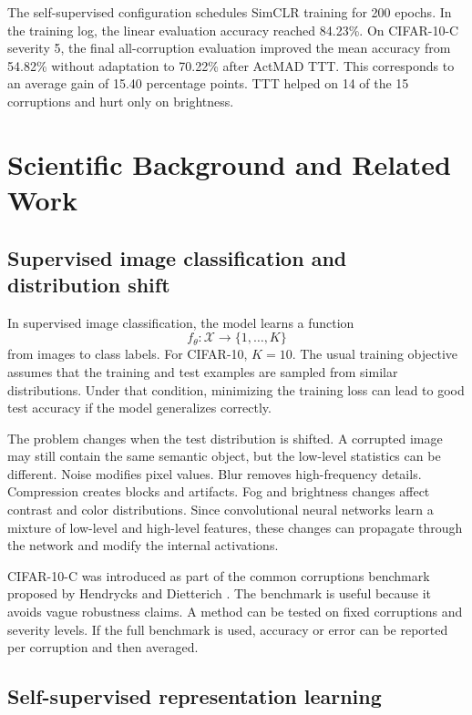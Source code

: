 \documentclass[a4paper,11pt]{article}
\begin{document}
The self-supervised configuration schedules SimCLR training for 200 epochs. In the training log, the linear evaluation accuracy reached 84.23\%. On CIFAR-10-C severity 5, the final all-corruption evaluation improved the mean accuracy from 54.82\% without adaptation to 70.22\% after ActMAD TTT. This corresponds to an average gain of 15.40 percentage points. TTT helped on 14 of the 15 corruptions and hurt only on brightness.

\section{Scientific Background and Related Work}

\subsection{Supervised image classification and distribution shift}

In supervised image classification, the model learns a function
\[
f_\theta : \mathcal{X} \rightarrow \{1,\ldots,K\}
\]
from images to class labels. For CIFAR-10, \(K=10\). The usual training objective assumes that the training and test examples are sampled from similar distributions. Under that condition, minimizing the training loss can lead to good test accuracy if the model generalizes correctly.

The problem changes when the test distribution is shifted. A corrupted image may still contain the same semantic object, but the low-level statistics can be different. Noise modifies pixel values. Blur removes high-frequency details. Compression creates blocks and artifacts. Fog and brightness changes affect contrast and color distributions. Since convolutional neural networks learn a mixture of low-level and high-level features, these changes can propagate through the network and modify the internal activations.

CIFAR-10-C was introduced as part of the common corruptions benchmark proposed by Hendrycks and Dietterich \citep{hendrycks2019robustness}. The benchmark is useful because it avoids vague robustness claims. A method can be tested on fixed corruptions and severity levels. If the full benchmark is used, accuracy or error can be reported per corruption and then averaged.

\subsection{Self-supervised representation learning}
\end{document}
